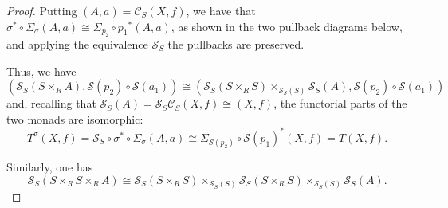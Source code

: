 \begin{theorem}
\begin{proof}
       Putting $(A,a)=\mathcal{C}_S(X,f)$, we have that $\sigma^*\circ\Sigma_\sigma(A,a)\cong\Sigma_{p_2}\circ{p_1}^*(A,a)$, as shown in the two pullback diagrams below, and applying the equivalence $\mathcal{S}_S$ the pullbacks are preserved.
        \begin{center}
        \end{center}
        Thus, we have 
        \[ (\mathcal{S}_S(S\times_RA), \mathcal{S}(p_2)\circ\mathcal{S}(a_1)) \cong (\mathcal{S}_S(S\times_RS)\times_{\mathcal{S}_S(S)}\mathcal{S}_S(A), \mathcal{S}(p_2)\circ\mathcal{S}(a_1))  \]
        and, recalling that $\mathcal{S}_S(A)=\mathcal{S}_S\mathcal{C}_S(X,f)\cong(X,f)$, the functorial parts of the two monads are isomorphic:
        \[ T^\sigma(X,f) = \mathcal{S}_S\circ\sigma^*\circ\Sigma_\sigma(A,a) \cong \Sigma_{\mathcal{S}(p_2)}\circ{\mathcal{S}(p_1)}^*(X,f) = T(X,f). \]

        Similarly, one has
        \[ \mathcal{S}_S(S\times_RS\times_RA)\cong \mathcal{S}_S(S\times_RS)\times_{\mathcal{S}_S(S)}\mathcal{S}_S(S\times_RS)\times_{\mathcal{S}_S(S)}\mathcal{S}_S(A). \]


\end{proof}
\end{theorem}
